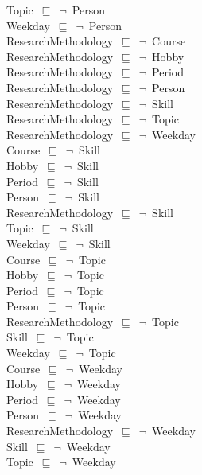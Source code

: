 \documentclass{article}
\begin{document}
Topic~\ensuremath{\sqsubseteq}~\ensuremath{\lnot}~Person\\
Weekday~\ensuremath{\sqsubseteq}~\ensuremath{\lnot}~Person\\
ResearchMethodology~\ensuremath{\sqsubseteq}~\ensuremath{\lnot}~Course\\
ResearchMethodology~\ensuremath{\sqsubseteq}~\ensuremath{\lnot}~Hobby\\
ResearchMethodology~\ensuremath{\sqsubseteq}~\ensuremath{\lnot}~Period\\
ResearchMethodology~\ensuremath{\sqsubseteq}~\ensuremath{\lnot}~Person\\
ResearchMethodology~\ensuremath{\sqsubseteq}~\ensuremath{\lnot}~Skill\\
ResearchMethodology~\ensuremath{\sqsubseteq}~\ensuremath{\lnot}~Topic\\
ResearchMethodology~\ensuremath{\sqsubseteq}~\ensuremath{\lnot}~Weekday\\
Course~\ensuremath{\sqsubseteq}~\ensuremath{\lnot}~Skill\\
Hobby~\ensuremath{\sqsubseteq}~\ensuremath{\lnot}~Skill\\
Period~\ensuremath{\sqsubseteq}~\ensuremath{\lnot}~Skill\\
Person~\ensuremath{\sqsubseteq}~\ensuremath{\lnot}~Skill\\
ResearchMethodology~\ensuremath{\sqsubseteq}~\ensuremath{\lnot}~Skill\\
Topic~\ensuremath{\sqsubseteq}~\ensuremath{\lnot}~Skill\\
Weekday~\ensuremath{\sqsubseteq}~\ensuremath{\lnot}~Skill\\
Course~\ensuremath{\sqsubseteq}~\ensuremath{\lnot}~Topic\\
Hobby~\ensuremath{\sqsubseteq}~\ensuremath{\lnot}~Topic\\
Period~\ensuremath{\sqsubseteq}~\ensuremath{\lnot}~Topic\\
Person~\ensuremath{\sqsubseteq}~\ensuremath{\lnot}~Topic\\
ResearchMethodology~\ensuremath{\sqsubseteq}~\ensuremath{\lnot}~Topic\\
Skill~\ensuremath{\sqsubseteq}~\ensuremath{\lnot}~Topic\\
Weekday~\ensuremath{\sqsubseteq}~\ensuremath{\lnot}~Topic\\
Course~\ensuremath{\sqsubseteq}~\ensuremath{\lnot}~Weekday\\
Hobby~\ensuremath{\sqsubseteq}~\ensuremath{\lnot}~Weekday\\
Period~\ensuremath{\sqsubseteq}~\ensuremath{\lnot}~Weekday\\
Person~\ensuremath{\sqsubseteq}~\ensuremath{\lnot}~Weekday\\
ResearchMethodology~\ensuremath{\sqsubseteq}~\ensuremath{\lnot}~Weekday\\
Skill~\ensuremath{\sqsubseteq}~\ensuremath{\lnot}~Weekday\\
Topic~\ensuremath{\sqsubseteq}~\ensuremath{\lnot}~Weekday\\
\end{document}
